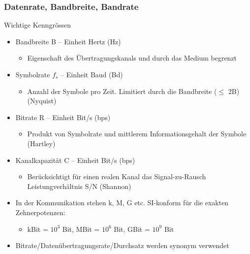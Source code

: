 \subsubsection{Datenrate, Bandbreite, Bandrate}

\begin{KR}{Wichtige Kenngrössen}
    \begin{itemize}
        \item Bandbreite B – Einheit Hertz (Hz)
        \begin{itemize}
            \item Eigenschaft des Übertragungskanals und durch das Medium begrenzt
        \end{itemize}
        \item Symbolrate $f_s$ – Einheit Baud (Bd)
        \begin{itemize}
            \item Anzahl der Symbole pro Zeit. Limitiert durch die Bandbreite ($\leq$ 2B) (Nyquist)
        \end{itemize}
        \item Bitrate R – Einheit Bit/s (bps)
        \begin{itemize}
            \item Produkt von Symbolrate und mittlerem Informationsgehalt der Symbole (Hartley)
        \end{itemize}
        \item Kanalkapazität C – Einheit Bit/s (bps)
        \begin{itemize}
            \item Berücksichtigt für einen realen Kanal das Signal-zu-Rausch Leistungverhältnis S/N (Shannon)
        \end{itemize}
    \end{itemize}
\end{KR}

\begin{remark}
    \begin{itemize}
        \item In der Kommunikation stehen k, M, G etc. SI-konform für die exakten Zehnerpotenzen:
        \begin{itemize}
            \item kBit = $10^3$ Bit, MBit = $10^6$ Bit, GBit = $10^9$ Bit
        \end{itemize}
        \item Bitrate/Datenübertragungsrate/Durchsatz werden synonym verwendet
    \end{itemize}
\end{remark}

